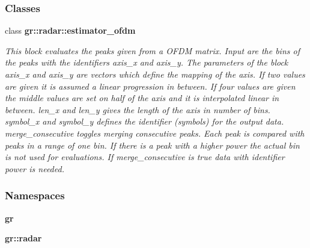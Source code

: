 \subsubsection*{Classes}
\begin{DoxyCompactItemize}
\item 
class {\bf gr\+::radar\+::estimator\+\_\+ofdm}
\begin{DoxyCompactList}\small\item\em This block evaluates the peaks given from a O\+F\+DM matrix. Input are the bins of the peaks with the identifiers \textquotesingle{}axis\+\_\+x\textquotesingle{} and \textquotesingle{}axis\+\_\+y\textquotesingle{}. The parameters of the block axis\+\_\+x and axis\+\_\+y are vectors which define the mapping of the axis. If two values are given it is assumed a linear progression in between. If four values are given the middle values are set on half of the axis and it is interpolated linear in between. len\+\_\+x and len\+\_\+y gives the length of the axis in number of bins. symbol\+\_\+x and symbol\+\_\+y defines the identifier (symbols) for the output data. merge\+\_\+consecutive toggles merging consecutive peaks. Each peak is compared with peaks in a range of one bin. If there is a peak with a higher power the actual bin is not used for evaluations. If merge\+\_\+consecutive is true data with identifier \textquotesingle{}power\textquotesingle{} is needed. \end{DoxyCompactList}\end{DoxyCompactItemize}
\subsubsection*{Namespaces}
\begin{DoxyCompactItemize}
\item 
 {\bf gr}
\item 
 {\bf gr\+::radar}
\end{DoxyCompactItemize}
